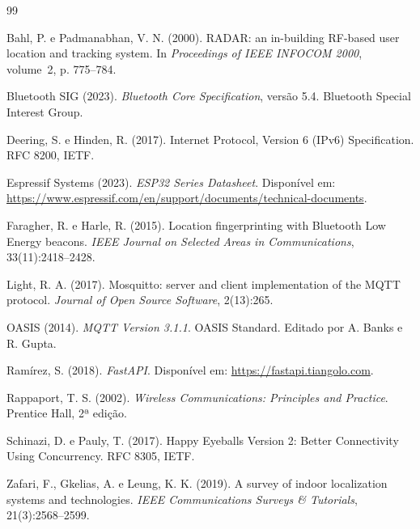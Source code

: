 \documentclass[12pt]{article}
\begin{document}
\begin{thebibliography}{99}

Bahl, P. e Padmanabhan, V. N. (2000). RADAR: an in-building RF-based user location and tracking
system. In \textit{Proceedings of IEEE INFOCOM 2000}, volume~2, p. 775--784.

Bluetooth SIG (2023). \textit{Bluetooth Core Specification}, versão 5.4. Bluetooth Special
Interest Group.

Deering, S. e Hinden, R. (2017). Internet Protocol, Version 6 (IPv6) Specification. RFC 8200,
IETF.

Espressif Systems (2023). \textit{ESP32 Series Datasheet}. Disponível em:
\url{https://www.espressif.com/en/support/documents/technical-documents}.

Faragher, R. e Harle, R. (2015). Location fingerprinting with Bluetooth Low Energy beacons.
\textit{IEEE Journal on Selected Areas in Communications}, 33(11):2418--2428.

Light, R. A. (2017). Mosquitto: server and client implementation of the MQTT protocol.
\textit{Journal of Open Source Software}, 2(13):265.

OASIS (2014). \textit{MQTT Version 3.1.1}. OASIS Standard. Editado por A. Banks e R. Gupta.

Ramírez, S. (2018). \textit{FastAPI}. Disponível em: \url{https://fastapi.tiangolo.com}.

Rappaport, T. S. (2002). \textit{Wireless Communications: Principles and Practice}. Prentice Hall,
2ª edição.

Schinazi, D. e Pauly, T. (2017). Happy Eyeballs Version 2: Better Connectivity Using Concurrency.
RFC 8305, IETF.

Zafari, F., Gkelias, A. e Leung, K. K. (2019). A survey of indoor localization systems and
technologies. \textit{IEEE Communications Surveys \& Tutorials}, 21(3):2568--2599.

\end{thebibliography}
\end{document}
